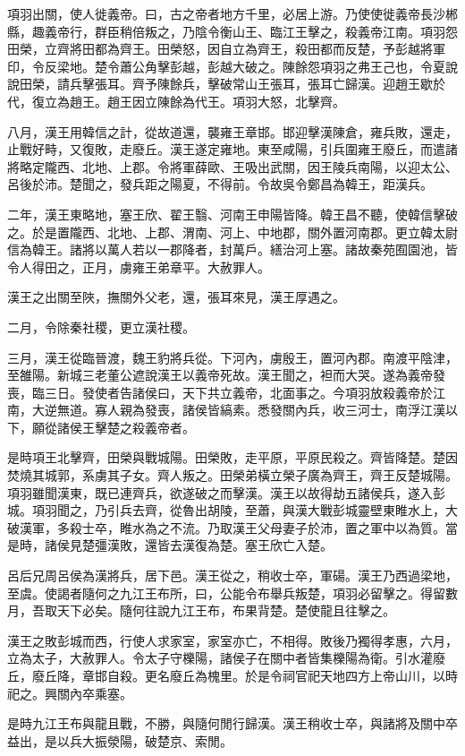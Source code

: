 項羽出關，使人徙義帝。曰，古之帝者地方千里，必居上游。乃使使徙義帝長沙郴縣，趣義帝行，群臣稍倍叛之，乃陰令衡山王、臨江王擊之，殺義帝江南。項羽怨田榮，立齊將田都為齊王。田榮怒，因自立為齊王，殺田都而反楚，予彭越將軍印，令反梁地。楚令蕭公角擊彭越，彭越大破之。陳餘怨項羽之弗王己也，令夏說說田榮，請兵擊張耳。齊予陳餘兵，擊破常山王張耳，張耳亡歸漢。迎趙王歇於代，復立為趙王。趙王因立陳餘為代王。項羽大怒，北擊齊。

八月，漢王用韓信之計，從故道還，襲雍王章邯。邯迎擊漢陳倉，雍兵敗，還走，止戰好畤，又復敗，走廢丘。漢王遂定雍地。東至咸陽，引兵圍雍王廢丘，而遣諸將略定隴西、北地、上郡。令將軍薛歐、王吸出武關，因王陵兵南陽，以迎太公、呂後於沛。楚聞之，發兵距之陽夏，不得前。令故吳令鄭昌為韓王，距漢兵。

二年，漢王東略地，塞王欣、翟王翳、河南王申陽皆降。韓王昌不聽，使韓信擊破之。於是置隴西、北地、上郡、渭南、河上、中地郡，關外置河南郡。更立韓太尉信為韓王。諸將以萬人若以一郡降者，封萬戶。繕治河上塞。諸故秦苑囿園池，皆令人得田之，正月，虜雍王弟章平。大赦罪人。

漢王之出關至陜，撫關外父老，還，張耳來見，漢王厚遇之。

二月，令除秦社稷，更立漢社稷。

三月，漢王從臨晉渡，魏王豹將兵從。下河內，虜殷王，置河內郡。南渡平陰津，至雒陽。新城三老董公遮說漢王以義帝死故。漢王聞之，袒而大哭。遂為義帝發喪，臨三日。發使者告諸侯曰，天下共立義帝，北面事之。今項羽放殺義帝於江南，大逆無道。寡人親為發喪，諸侯皆縞素。悉發關內兵，收三河士，南浮江漢以下，願從諸侯王擊楚之殺義帝者。

是時項王北擊齊，田榮與戰城陽。田榮敗，走平原，平原民殺之。齊皆降楚。楚因焚燒其城郭，系虜其子女。齊人叛之。田榮弟橫立榮子廣為齊王，齊王反楚城陽。項羽雖聞漢東，既已連齊兵，欲遂破之而擊漢。漢王以故得劫五諸侯兵，遂入彭城。項羽聞之，乃引兵去齊，從魯出胡陵，至蕭，與漢大戰彭城靈壁東睢水上，大破漢軍，多殺士卒，睢水為之不流。乃取漢王父母妻子於沛，置之軍中以為質。當是時，諸侯見楚彊漢敗，還皆去漢復為楚。塞王欣亡入楚。

呂后兄周呂侯為漢將兵，居下邑。漢王從之，稍收士卒，軍碭。漢王乃西過梁地，至虞。使謁者隨何之九江王布所，曰，公能令布舉兵叛楚，項羽必留擊之。得留數月，吾取天下必矣。隨何往說九江王布，布果背楚。楚使龍且往擊之。

漢王之敗彭城而西，行使人求家室，家室亦亡，不相得。敗後乃獨得孝惠，六月，立為太子，大赦罪人。令太子守櫟陽，諸侯子在關中者皆集櫟陽為衛。引水灌廢丘，廢丘降，章邯自殺。更名廢丘為槐里。於是令祠官祀天地四方上帝山川，以時祀之。興關內卒乘塞。

是時九江王布與龍且戰，不勝，與隨何閒行歸漢。漢王稍收士卒，與諸將及關中卒益出，是以兵大振滎陽，破楚京、索閒。

